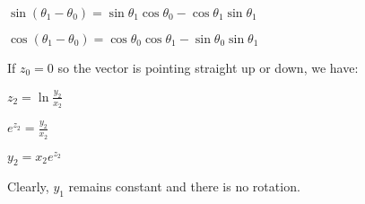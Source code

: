 $\sin(\theta_1-\theta_0) = \sin\theta_1 \cos\theta_0 - \cos\theta_1 \sin\theta_1$

$\cos(\theta_1-\theta_0) = \cos\theta_0 \cos\theta_1 - \sin\theta_0 \sin\theta_1$

If $z_0 = 0$ so the vector is pointing straight up or down, we have:

$z_2 = \ln\frac{y_2}{x_2}$

$e^{z_2} = \frac{y_2}{x_2}$

$y_2 = x_2e^{z_2}$

Clearly, $y_1$ remains constant and there is no rotation.